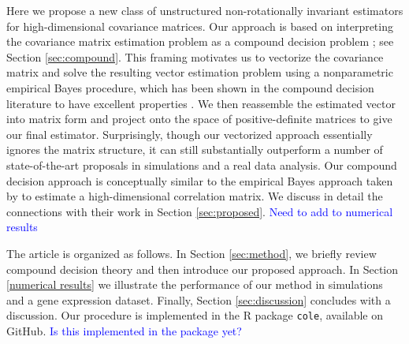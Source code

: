 \documentclass[useAMS,referee,usenatbib]{biom}
\def\blue{\textcolor{blue}}
\begin{document}

Here we propose a new class of unstructured non-rotationally invariant estimators for high-dimensional covariance matrices. Our approach is based on interpreting the covariance matrix estimation problem as a compound decision problem \citep{robbins1951asymptotically}; see Section \ref{sec:compound}. This framing motivates us to vectorize the covariance matrix and solve the resulting vector estimation problem using a nonparametric empirical Bayes procedure, which has been shown in the compound decision literature to have excellent properties \citep{jiang2009general, koenker2014convex, efron2019bayes}. We then reassemble the estimated vector into matrix form and project onto the space of positive-definite matrices to give our final estimator. Surprisingly, though our vectorized approach essentially ignores the matrix structure, it can still substantially outperform a number of state-of-the-art proposals in simulations and a real data analysis. Our compound decision approach is conceptually similar to the empirical Bayes approach taken by \citet{dey2018corshrink} to estimate a high-dimensional correlation matrix. We discuss in detail the connections with their work in Section \ref{sec:proposed}. \blue{Need to add to numerical results}

The article is organized as follows. In Section \eqref{sec:method}, we briefly review compound decision theory and then introduce our proposed approach. In Section \eqref{numerical results} we illustrate the performance of our method in simulations and a gene expression dataset. Finally, Section \eqref{sec:discussion} concludes with a discussion. Our procedure is implemented in the R package \verb|cole|, available on GitHub. \blue{Is this implemented in the package yet?}
\end{document}
